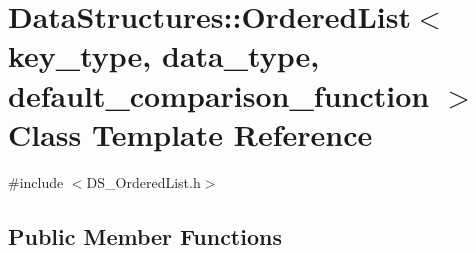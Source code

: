 \hypertarget{class_data_structures_1_1_ordered_list}{\section{Data\-Structures\-:\-:Ordered\-List$<$ key\-\_\-type, data\-\_\-type, default\-\_\-comparison\-\_\-function $>$ Class Template Reference}
\label{class_data_structures_1_1_ordered_list}
}


{\ttfamily \#include $<$D\-S\-\_\-\-Ordered\-List.\-h$>$}

\subsection*{Public Member Functions}
